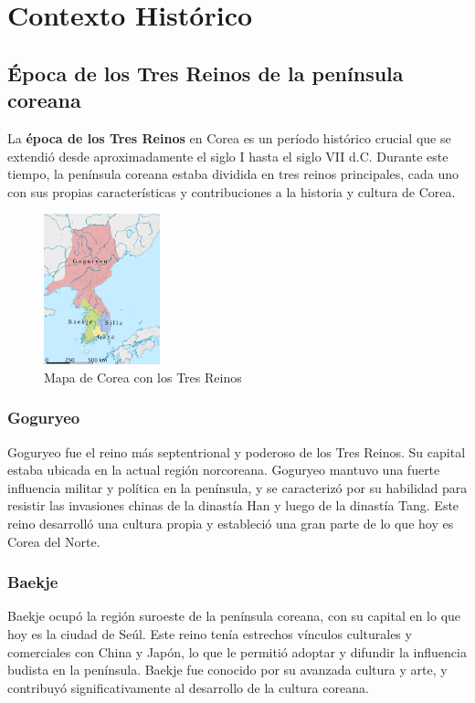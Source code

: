 \chapter{Contexto Histórico}
\section{Época de los Tres Reinos de la península coreana}

La \textbf{época de los Tres Reinos} en Corea es un período histórico crucial que se extendió desde aproximadamente el siglo I hasta el siglo VII d.C. Durante este tiempo, la península coreana estaba dividida en tres reinos principales, cada uno con sus propias características y contribuciones a la historia y cultura de Corea.

\begin{figure}[h]
	\centering
	\includegraphics[width=0.3\textwidth]{images/Historia/mapa_tres_reinos.png} %
	\caption{Mapa de Corea con los Tres Reinos}
\end{figure}

\subsection{Goguryeo}

Goguryeo fue el reino más septentrional y poderoso de los Tres Reinos. Su capital estaba ubicada en la actual región norcoreana. Goguryeo mantuvo una fuerte influencia militar y política en la península, y se caracterizó por su habilidad para resistir las invasiones chinas de la dinastía Han y luego de la dinastía Tang. Este reino desarrolló una cultura propia y estableció una gran parte de lo que hoy es Corea del Norte.

\subsection{Baekje}

Baekje ocupó la región suroeste de la península coreana, con su capital en lo que hoy es la ciudad de Seúl. Este reino tenía estrechos vínculos culturales y comerciales con China y Japón, lo que le permitió adoptar y difundir la influencia budista en la península. Baekje fue conocido por su avanzada cultura y arte, y contribuyó significativamente al desarrollo de la cultura coreana.

